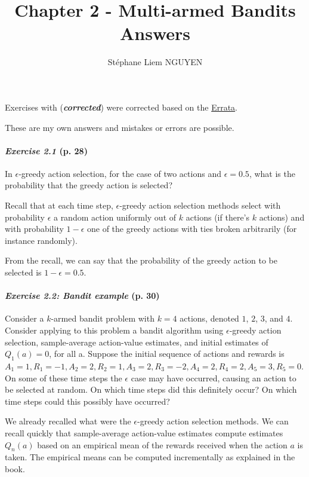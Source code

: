 \documentclass[10pt,a4paper]{article}
\title{Chapter 2 - Multi-armed Bandits Answers}
\author{Stéphane Liem NGUYEN}
\begin{document}
\maketitle

Exercises with (\textbf{\textit{corrected}}) were corrected based on the \href{http://incompleteideas.net/book/errata.html}{Errata}.

These are my own answers and mistakes or errors are possible.

\paragraph{\textit{Exercise 2.1} (p. 28)} In $\epsilon$-greedy action selection, for the case of two actions and $\epsilon = 0.5$, what is
the probability that the greedy action is selected?

\bigskip
Recall that at each time step, $\epsilon$-greedy action selection methods select with probability $\epsilon$ a random action uniformly out of $k$ actions (if there's $k$ actions) and with probability $1-\epsilon$ one of the greedy actions with ties broken arbitrarily (for instance randomly).

From the recall, we can say that the probability of the greedy action to be selected   is $1-\epsilon = 0.5$.

\paragraph{\textit{Exercise 2.2: Bandit example} (p. 30)} Consider a $k$-armed bandit problem with $k = 4$ actions,
denoted $1$, $2$, $3$, and $4$. Consider applying to this problem a bandit algorithm using
$\epsilon$-greedy action selection, sample-average action-value estimates, and initial estimates
of $Q_1(a) = 0$, for all a. Suppose the initial sequence of actions and rewards is $A_1 = 1,
R_1 = -1, A_2 = 2, R_2 = 1, A_3 = 2, R_3 = -2, A_4 = 2, R_4 = 2, A_5 = 3, R_5 = 0$. On some of these time steps the $\epsilon$ case may have occurred, causing an action to be selected at
random. On which time steps did this definitely occur? On which time steps could this
possibly have occurred?

\bigskip
We already recalled what were the $\epsilon$-greedy action selection methods. We can recall quickly that sample-average action-value estimates compute estimates $Q_n(a)$ based on an empirical mean of the rewards received when the action $a$ is taken. The empirical means can be computed incrementally as explained in the book.
\end{document}
